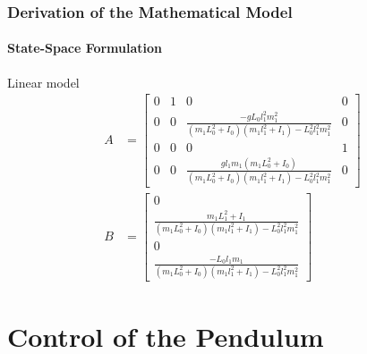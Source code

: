 \documentclass[]{beamer}
\begin{document}
\begin{frame}
	\frametitle{Derivation of the Mathematical Model}
	\framesubtitle{State-Space Formulation}
	Linear model
	\begin{subequations}
		\begin{align*}
		A &=\begin{bmatrix}0&1&0&0\\
		0&0&\frac{-gL_0l_1^2m_1^2}{(m_1L_0^2+I_0)(m_1l_1^2+I_1)-L_0^2l_1^2m_1^2}&0\\
		0&0&0&1\\
		0&0&\frac{gl_1m_1(m_1L_0^2+I_0)}{(m_1L_0^2+I_0)(m_1l_1^2+I_1)-L_0^2l_1^2m_1^2}&0
		\end{bmatrix}\\
		B &=	\begin{bmatrix}
		0\\ 
		\frac{m_1L_1^2+I_1}{(m_1L_0^2+I_0)(m_1l_1^2+I_1)-L_0^2l_1^2m_1^2}\\
		0\\
		\frac{-L_0l_1m_1}{(m_1L_0^2+I_0)(m_1l_1^2+I_1)-L_0^2l_1^2m_1^2}
		\end{bmatrix}
		\end{align*}
	\end{subequations}
\end{frame}

\section{Control of the Pendulum}
\end{document}
